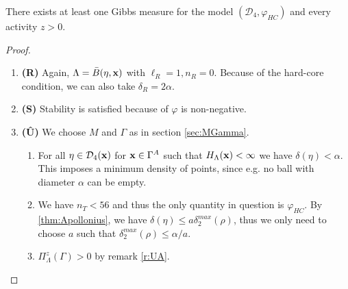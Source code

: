 \begin{theorem}\label{thm:E2}
	There exists at least one Gibbs measure for the model $(\mathcal D_4,\varphi_{HC})$ and every activity $z>0.$
\end{theorem}
\begin{proof}
\begin{enumerate}[]
	\item \textbf{(R)} Again, $\Lambda = \bar B(\eta,{\mathbf{x}})$ with $\ell_R = 1, n_R = 0$. Because of the hard-core condition, we can also take $\delta_R = 2\alpha$.
	\item \textbf{(S)} Stability is satisfied because of $\varphi$ is non-negative.
	\item \textbf{(\^U)} We choose $M$ and $\Gamma$ as in section \ref{sec:MGamma}.
		\begin{enumerate}[(\^U1)]
			\item For all $\eta \in \mathcal D_4({\mathbf{x}})$ for ${\mathbf{x}}\in\Gamma^A$ such that $H_\Lambda({\mathbf{x}})<\infty$ we have $\delta(\eta) < \alpha$. This imposes a minimum density of points, since e.g. no ball with diameter $\alpha$ can be empty. 
			\item We have $n_T<56$ and thus the only quantity in question is $\varphi_{HC}$. By \ref{thm:Apollonius}, we have $\delta(\eta)\leq a\delta^{max}_2(\rho)$, thus we only need to choose $a$ such that $\delta^{max}_2(\rho) \leq \alpha / a$.
			\item $\Pi^z_\Lambda(\Gamma)>0$ by remark \ref{r:UA}.
		\end{enumerate}
\end{enumerate}
\end{proof}



